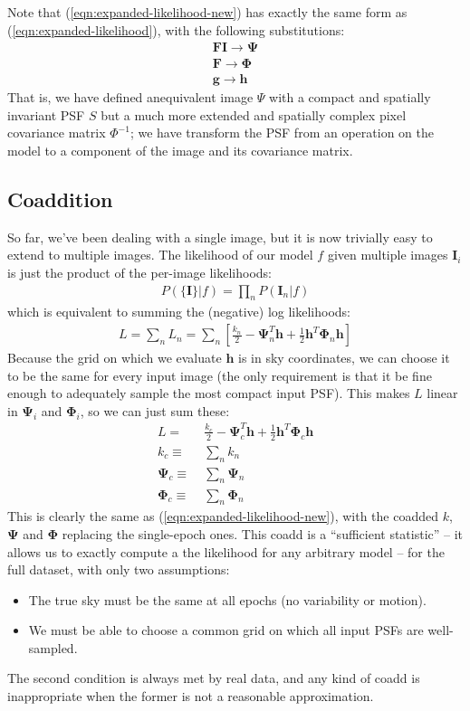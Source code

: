 \documentclass[10pt]{article}
\newcommand{\eqnref}[1]{(\ref{eqn:#1})}
\begin{document}
Note that \eqnref{expanded-likelihood-new} has exactly the same form as \eqnref{expanded-likelihood}, with the following substitutions:
\begin{align}
\bm{F}\bm{I} \longrightarrow  \bm{\Psi} \\
\bm{F} \longrightarrow \bm{\Phi} \\
\bm{g} \longrightarrow \bm{h}
\end{align}
That is, we have defined anequivalent image $\Psi$ with a compact and spatially invariant PSF $S$ but a much more extended and spatially complex pixel covariance matrix $\Phi^{-1}$; we have transform the PSF from an operation on the model to a component of the image and its covariance matrix.

\subsection{Coaddition}

So far, we've been dealing with a single image, but it is now trivially easy to extend to multiple images.  The likelihood of our model $f$ given multiple images $\bm{I}_i$ is just the product of the per-image likelihoods:
\begin{align}
    P(\{\bm{I}\}|f) = \prod_n P(\bm{I}_n|f)
\end{align}
which is equivalent to summing the (negative) log likelihoods:
\begin{align}
    L = \sum_n L_n =
        \sum_n \left[ \frac{k_n}{2} - \bm{\Psi}_n^T\!\bm{h}
        + \frac{1}{2}\bm{h}^T\!\bm{\Phi}_n\bm{h} \right]
\end{align}
Because the grid on which we evaluate $\bm{h}$ is in sky coordinates, we can choose it to be the same for every input image (the only requirement is that it be fine enough to adequately sample the most compact input PSF).
This makes $L$ linear in $\bm{\Psi}_i$ and $\bm{\Phi}_i$, so we can just sum these:
\begin{align}
    L =\;& \frac{k_c}{2} - \bm{\Psi}_c^T\!\bm{h} + \frac{1}{2}\bm{h}^T\!\bm{\Phi}_c\bm{h} \\
    k_c \equiv\;& \sum_n k_n \\
    \bm{\Psi}_c \equiv\;& \sum_n \bm{\Psi}_n \\
    \bm{\Phi}_c \equiv\;& \sum_n \bm{\Phi}_n
\end{align}
This is clearly the same as \eqnref{expanded-likelihood-new}, with the coadded $k$, $\bm{\Psi}$ and $\bm{\Phi}$ replacing the single-epoch ones.  This coadd is a ``sufficient statistic'' -- it allows us to exactly compute a the likelihood for any arbitrary model -- for the full dataset, with only two assumptions:
\begin{itemize}
\item The true sky must be the same at all epochs (no variability or motion).
\item We must be able to choose a common grid on which all input PSFs are well-sampled.
\end{itemize}
The second condition is always met by real data, and any kind of coadd is inappropriate when the former is not a reasonable approximation.
\end{document}

